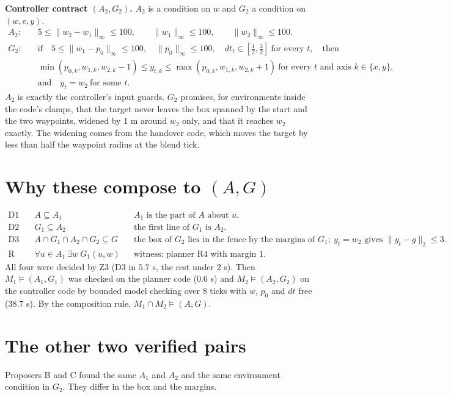 \documentclass[10pt]{article}
\newcommand{\ninf}[1]{\lVert #1\rVert_\infty}
\newcommand{\ntwo}[1]{\lVert #1\rVert_2}
\begin{document}
\textbf{Controller contract $(A_2,G_2)$.} $A_2$ is a condition on $w$ and $G_2$ a condition on $(w,e,y)$.
\begin{align*}
A_2:\quad& 5\le\ninf{w_2-w_1}\le 100,\qquad \ninf{w_1}\le 100,\qquad \ninf{w_2}\le 100.\\
G_2:\quad& \text{if}\quad 5\le\ninf{w_1-p_0}\le 100,\quad \ninf{p_0}\le 100,\quad dt_t\in[\tfrac12,\tfrac32]\ \text{for every } t,\quad\text{then}\\
& \min(p_{0,k},w_{1,k},w_{2,k}-1)\le y_{t,k}\le\max(p_{0,k},w_{1,k},w_{2,k}+1)\ \text{for every } t \text{ and axis } k\in\{x,y\},\\
& \text{and}\quad y_t=w_2\ \text{for some } t.
\end{align*}
$A_2$ is exactly the controller's input guards. $G_2$ promises, for environments inside the code's clamps, that the target never leaves the box spanned by the start and the two waypoints, widened by $1$ m around $w_2$ only, and that it reaches $w_2$ exactly. The widening comes from the handover code, which moves the target by less than half the waypoint radius at the blend tick.

\section*{Why these compose to $(A,G)$}
\begin{align*}
\text{D1}\quad& A\subseteq A_1 && A_1 \text{ is the part of } A \text{ about } u.\\
\text{D2}\quad& G_1\subseteq A_2 && \text{the first line of } G_1 \text{ is } A_2.\\
\text{D3}\quad& A\cap G_1\cap A_2\cap G_2\subseteq G && \text{the box of } G_2 \text{ lies in the fence by the margins of } G_1;\ y_t=w_2 \text{ gives } \ntwo{y_t-g}\le 3.\\
\text{R}\quad& \forall u\in A_1\ \exists w\ G_1(u,w) && \text{witness: planner R4 with margin } 1.
\end{align*}
All four were decided by Z3 (D3 in $5.7$ s, the rest under $2$ s). Then $M_1\models(A_1,G_1)$ was checked on the planner code ($0.6$ s) and $M_2\models(A_2,G_2)$ on the controller code by bounded model checking over $8$ ticks with $w$, $p_0$ and $dt$ free ($38.7$ s). By the composition rule, $M_1\cap M_2\models(A,G)$.

\section*{The other two verified pairs}
Proposers B and C found the same $A_1$ and $A_2$ and the same environment condition in $G_2$. They differ in the box and the margins.
\end{document}
